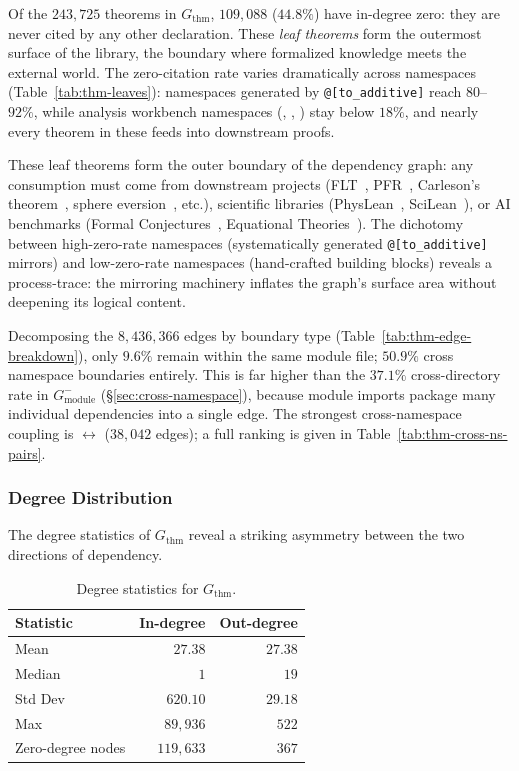 \label{sec:thm-leaves}
Of the $243{,}725$ theorems in $G_{\mathrm{thm}}$, $109{,}088$ ($44.8\%$) have in-degree zero: they are never cited by any other declaration. These \emph{leaf theorems} form the outermost surface of the library, the boundary where formalized knowledge meets the external world. The zero-citation rate varies dramatically across namespaces (Table~\ref{tab:thm-leaves}): namespaces generated by \texttt{@[to\_additive]} reach $80$--$92\%$, while analysis workbench namespaces (, , ) stay below $18\%$, and nearly every theorem in these feeds into downstream proofs.

\label{rem:leaf-theorems}
These leaf theorems form the outer boundary of the dependency graph: any consumption must come from downstream projects (FLT~\cite{flt_lean}, PFR~\cite{pfr_lean}, Carleson's theorem~\cite{carleson_lean}, sphere eversion~\cite{sphere_eversion}, etc.), scientific libraries (PhysLean~\cite{physlean}, SciLean~\cite{scilean}), or AI benchmarks (Formal Conjectures~\cite{formal_conjectures}, Equational Theories~\cite{equational_theories}). The dichotomy between high-zero-rate namespaces (systematically generated \texttt{@[to\_additive]} mirrors) and low-zero-rate namespaces (hand-crafted building blocks) reveals a process-trace: the mirroring machinery inflates the graph's surface area without deepening its logical content.

\label{sec:thm-cross-namespace}
Decomposing the $8{,}436{,}366$ edges by boundary type (Table~\ref{tab:thm-edge-breakdown}), only $9.6\%$ remain within the same module file; $50.9\%$ cross namespace boundaries entirely. This is far higher than the $37.1\%$ cross-directory rate in $G_{\mathrm{module}}^{-}$ (\S\ref{sec:cross-namespace}), because module imports package many individual dependencies into a single edge. The strongest cross-namespace coupling is  $\leftrightarrow$  ($38{,}042$ edges); a full ranking is given in Table~\ref{tab:thm-cross-ns-pairs}.

\subsubsection{Degree Distribution}
\label{sec:thm-degree}

The degree statistics of $G_{\mathrm{thm}}$ reveal a striking asymmetry between the two directions of dependency.

\begin{table}[ht]
\centering
\caption{Degree statistics for $G_{\mathrm{thm}}$.}
\label{tab:thm-degree}
\begin{tabular}{lrr}
\toprule
Statistic & In-degree & Out-degree \\
\midrule
Mean    & $27.38$    & $27.38$ \\
Median  & $1$        & $19$ \\
Std Dev & $620.10$   & $29.18$ \\
Max     & $89{,}936$ & $522$ \\
Zero-degree nodes & $119{,}633$ & $367$ \\
\bottomrule
\end{tabular}
\end{table}


